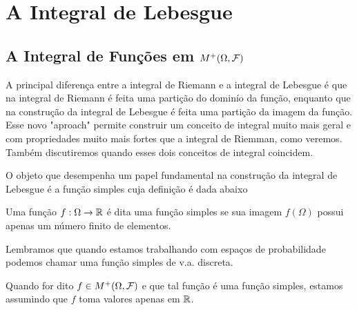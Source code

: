 \chapter[Aula 9]{A Integral de Lebesgue}
\chaptermark{}

\section{A Integral de Funções em $M^{+}(\Omega,\mathcal{F})$}

A principal diferença entre a integral de Riemann e a integral
de Lebesgue é que na integral de Riemann é feita uma 
partição do dominío da função, enquanto que na construção da
 integral de Lebesgue é feita uma partição da imagem da função.
Esse novo  "aproach" permite construir um conceito de integral muito
mais geral e com propriedades muito mais fortes  que a integral de Riemman, 
como veremos. Também discutiremos quando esses dois conceitos 
de integral coincidem.

O objeto que desempenha um papel fundamental na 
construção da integral de Lebesgue é a função simples
cuja definição é dada abaixo 
%
%
\begin{definicao}\label{def-funcao-simples}
Uma função $f:\Omega\to\mathbb{R}$ é dita uma função simples
se sua imagem $f(\Omega)$ possui apenas um número
finito de elementos.
\end{definicao}
%
%
%
%
\begin{observacao}
Lembramos que quando estamos trabalhando com 
espaços de probabilidade podemos chamar uma
função simples de v.a. discreta.
\end{observacao}


\begin{observacao}
Quando for dito $f\in M^{+}(\Omega,\mathcal{F})$
e que tal função é uma função simples, 
estamos assumindo que $f$ toma valores apenas em $\mathbb{R}$.
\end{observacao}


